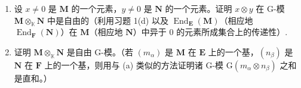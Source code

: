 \begin{enumerate}
\def\labelenumi{(\alph{enumi})}
\item
  设 \(x \neq 0\) 是 \(\mathbf{M}\) 的一个元素，\(y \neq 0\) 是 \(\mathbf{N}\) 的一个元素。证明 \(x \otimes y\) 在 G-模 \(\mathbf{M} \otimes_{\mathbb{K}} \mathbf{N}\) 中是自由的（利用习题 1(d) 以及 \(\operatorname{End}_{\mathbf{E}}(\mathbf{M})\)（相应地 \(\operatorname{End}_{\mathbf{F}}(\mathbf{N})\)）在 \(\mathbf{M}\)（相应地 \(\mathbf{N}\)）中异于 0 的元素所成集合上的传递性）.
\item
  证明 \(\mathbf{M} \otimes_{\mathbb{K}} \mathbf{N}\) 是自由 G-模。（若 \((m_{\alpha})\) 是 \(\mathbf{M}\) 在 \(\mathbf{E}\) 上的一个基，\((n_{\beta})\) 是 \(\mathbf{N}\) 在 \(\mathbf{F}\) 上的一个基，则用与 (a) 类似的方法证明诸 G-模 \(\mathrm{G}(m_{\alpha} \otimes n_{\beta})\) 之和是直和。）
\end{enumerate}

